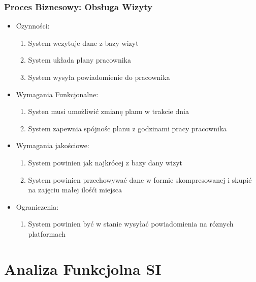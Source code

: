 \documentclass{article}
\begin{document}
	\subsubsection*{Proces Biznesowy: Obsługa Wizyty}
	\begin{itemize}
		\item Czynności:
			\begin{enumerate}
				\item System wczytuje dane z bazy wizyt
				\item System układa plany pracownika
				\item System wysyła powiadomienie do pracownika
			\end{enumerate}
		\item Wymagania Funkcjonalne:
			\begin{enumerate}
				\item Systen musi umożliwić zmianę planu w trakcie dnia
				\item System zapewnia spójnośc planu z godzinami pracy pracownika
			\end{enumerate}
		\item Wymagania jakościowe:
			\begin{enumerate}
				\item System powinien jak najkrócej z bazy dany wizyt
				\item System powinien przechowywać dane w formie skompresowanej i skupić na zajęciu małej ilośći miejsca
			\end{enumerate}
		\item Ograniczenia:
			\begin{enumerate}
				\item System powinien być w stanie wysyłać powiadomienia na róznych platformach
			\end{enumerate}
	\end{itemize}
	\newpage
	\section{Analiza Funkcjolna SI}
\end{document}
